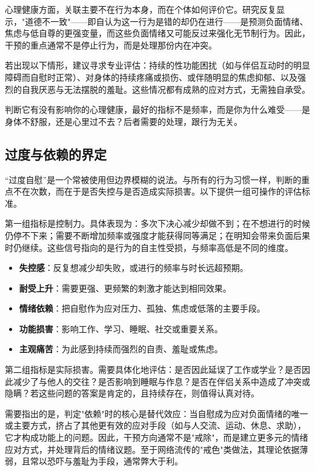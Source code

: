 \documentclass[12pt,UTF8]{ctexbook}
\newcommand{\keyword}[1]{\textbf{#1}}
\begin{document}
心理健康方面，关联主要不在行为本身，而在个体如何评价它。研究反复显示，"道德不一致"——即自认为这一行为是错的却仍在进行——是预测负面情绪、焦虑与低自尊的更强变量，而这些负面情绪又可能反过来强化无节制行为。因此，干预的重点通常不是停止行为，而是处理那份内在冲突。

若出现以下情形，建议寻求专业评估：持续的性功能困扰（如与伴侣互动时的明显障碍而自慰时正常）、对身体的持续疼痛或损伤、或伴随明显的焦虑抑郁、以及强烈的自我厌恶与无法摆脱的羞耻。这些情况都有成熟的应对方式，无需独自承受。

\begin{tcolorbox}[colback=pink!5!white,colframe=red!50!black,title=贴心小叮咛]
	判断它有没有影响你的心理健康，最好的指标不是频率，而是你为什么难受——是身体不舒服，还是心里过不去？后者需要的处理，跟行为无关。
\end{tcolorbox}
\subsection{过度与依赖的界定}

“过度自慰”是一个常被使用但边界模糊的说法。与所有的行为习惯一样，判断的重点不在次数，而在于是否失控与是否造成实际损害。以下提供一组可操作的评估标准。

第一组指标是控制力。具体表现为：多次下决心减少却做不到；在不想进行的时候仍停不下来；需要不断增加频率或强度才能获得同等满足；在明知会带来负面后果时仍继续。这些信号指向的是行为的自主性受损，与频率高低是不同的维度。

\begin{itemize}
	\item \keyword{失控感}：反复想减少却失败，或进行的频率与时长远超预期。
	\item \keyword{耐受上升}：需要更强、更频繁的刺激才能达到相同效果。
	\item \keyword{情绪依赖}：把自慰作为应对压力、孤独、焦虑或低落的主要手段。
	\item \keyword{功能损害}：影响工作、学习、睡眠、社交或重要关系。
	\item \keyword{主观痛苦}：为此感到持续而强烈的自责、羞耻或焦虑。
\end{itemize}

第二组指标是实际损害。需要具体化地评估：是否因此延误了工作或学业？是否因此减少了与他人的交往？是否影响到睡眠与作息？是否在伴侣关系中造成了冲突或隐瞒？若这些问题的答案是肯定的，且持续存在，则值得认真对待。

需要指出的是，判定"依赖"时的核心是替代效应：当自慰成为应对负面情绪的唯一或主要方式，挤占了其他更有效的应对手段（如与人交流、运动、休息、求助），它才构成功能上的问题。因此，干预方向通常不是"戒除"，而是建立更多元的情绪应对方式，并处理背后的情绪议题。至于网络流传的"戒色"类做法，其理论依据薄弱，且常以恐吓与羞耻为手段，通常弊大于利。
\end{document}
